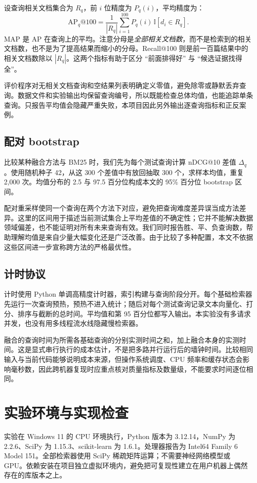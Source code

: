 \documentclass[sigconf,nonacm]{acmart}
\begin{document}
设查询相关文档集合为 $R_q$，前 $i$ 位精度为 $P_q(i)$，平均精度为：
\begin{equation}
\mathrm{AP}_q@100=\frac{1}{|R_q|}\sum_{i=1}^{100}P_q(i)\,\mathbb I[d_i\in R_q].
\end{equation}
MAP 是 AP 在查询上的平均。注意分母是\emph{全部相关文档数}，而不是检索到的相关文档数，也不是为了提高结果而缩小的分母。Recall@100 则是前一百篇结果中的相关文档数除以 $|R_q|$。这两个指标有助于区分 ``前面排得好'' 与 ``候选证据找得全''。

评价程序对无相关文档查询和空结果列表明确定义零值，避免除零或静默丢弃查询。数据文件和实验输出均保留查询编号，所以既能检查总体均值，也能追踪单条查询。只报告平均值会隐藏严重失败，本项目因此另外输出逐查询指标和正反案例。

\subsection{配对 bootstrap}
比较某种融合方法与 BM25 时，我们先为每个测试查询计算 nDCG@10 差值 $\Delta_q$。使用随机种子 42，从这 300 个差值中有放回抽取 300 个，求样本均值，重复 2,000 次。均值分布的 2.5 与 97.5 百分位构成本文的 95\% 百分位 bootstrap 区间。

配对重采样使同一个查询在两个方法下对应，避免把查询难度差异误当成方法差异。这里的区间用于描述当前测试集合上平均差值的不确定性；它并不能解决数据领域偏差，也不能证明对所有未来查询有效。我们同时报告胜、平、负查询数，帮助理解均值是来自少量大幅变化还是广泛改善。由于比较了多种配置，本文不依据这些区间进一步宣称跨方法的严格最优性。

\subsection{计时协议}
计时使用 Python 单调高精度计时器，索引构建与查询阶段分开。每个基础检索器先运行一次查询预热，预热不进入统计；随后对每个测试查询记录文本向量化、打分、排序与截断的总时间。平均值和第 95 百分位都写入输出。本实验没有多请求并发，也没有用多线程流水线隐藏慢检索器。

融合的查询时间为所需各基础查询的分别实测时间之和，加上融合本身的实测时间。这是显式串行执行的成本估计，不是把多路并行运行后的墙钟时间。比较相同输入与当前代码能够说明成本来源，但操作系统调度、CPU 频率和缓存状态会影响毫秒数，因此跨机器复现时应重点核对质量指标及数量级，不能要求时间逐位相同。

\section{实验环境与实现检查}
实验在 Windows 11 的 CPU 环境执行，Python 版本为 3.12.14，NumPy 为 2.2.6、SciPy 为 1.15.3、scikit-learn 为 1.6.1。处理器报告为 Intel64 Family 6 Model 151。全部检索器使用 SciPy 稀疏矩阵运算；不需要神经网络模型或 GPU。依赖安装在项目独立虚拟环境内，避免把可复现性建立在用户机器上偶然存在的库版本之上。
\end{document}
